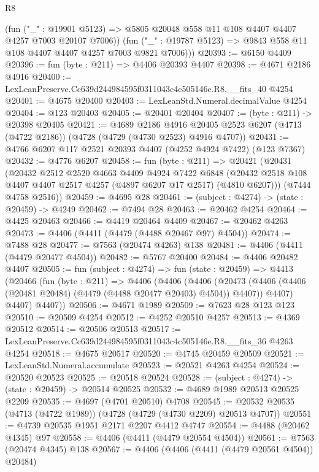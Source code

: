 \begin{lexlean}{R8}
\begin{coremodule}
          (fun ("_" : @19901 @5123) =>
          @5805 @20048 @558 @11 @108 @4407 @4407 @4257 @7003 @20107 @7006))
        (fun ("_" : @19787 @5123) => @9843 @558 @11 @108 @4407 @4407 @4257 @7003 @9821 @7006)))
@20393 := @6150 @4409
@20396 := fun (byte : @211) => @4406 @20393 @4407
@20398 := @4671 @2186 @4916
@20400 := LexLeanPreserve.Cc639d244984595f0311043c4c505146e.R8.__fits_40 @4254
@20401 := @4675 @20400
@20403 := LexLeanStd.Numeral.decimalValue @4254
@20404 := @123 @20403
@20405 := @20401 @20404
@20407 := (byte : @211) -> @20398 @20405
@20421 := @4689
    @2186
    @4916
    @20405
    @2523
    @6207
    (@4713 (@4722 @2186))
    (@4728 (@4729 (@4730 @2523) @4916 @4707))
@20431 := @4766 @6207 @117 @2521 @20393 @4407 (@4252 @4924 @7422) (@123 @7367)
@20432 := @4776 @6207
@20458 := fun (byte : @211) =>
  @20421
    (@20431
      (@20432
        @2512
        @2520
        @4663
        @4409
        @4924
        @7422
        @6848
        (@20432 @2518 @108 @4407 @4407 @2517 @4257 (@4897 @6207 @17 @2517) (@4810 @6207)))
      (@7444 @4758 @2516))
@20459 := @4695 @28
@20461 := (subject : @4274) -> (state : @20459) -> @4249
@20462 := @7494 @28
@20463 := @20462 @4254
@20464 := @4425 @20463
@20466 := @4419 @20464 @4409
@20467 := @20462 @4263
@20473 := @4406 (@4411 (@4479 (@4488 @20467 @97) @4504))
@20474 := @7488 @28
@20477 := @7563 (@20474 @4263) @138
@20481 := @4406 (@4411 (@4479 @20477 @4504))
@20482 := @5767 @20400
@20484 := @4406 @20482 @4407
@20505 := fun (subject : @4274) =>
  fun (state : @20459) =>
  @4413
    (@20466
      (fun (byte : @211) =>
      @4406
        (@4406
          (@4406
            (@20473 (@4406 (@4406 (@20481 @20484) (@4479 (@4488 @20477 @20403) @4504)) @4407))
            @4407)
          @4407)
        @4407))
@20506 := @4671 @1989
@20509 := @7623 @28 @123 @123
@20510 := @20509 @4254
@20512 := @4252 @20510 @4257
@20513 := @4369 @20512
@20514 := @20506 @20513
@20517 := LexLeanPreserve.Cc639d244984595f0311043c4c505146e.R8.__fits_36 @4263 @4254
@20518 := @4675 @20517
@20520 := @4745 @20459 @20509
@20521 := LexLeanStd.Numeral.accumulate
@20523 := @20521 @4263 @4254
@20524 := @20520 @20523
@20525 := @20518 @20524
@20528 := (subject : @4274) -> (state : @20459) -> @20514 @20525
@20532 := @4689 @1989 @20513 @20525 @2209
@20535 := @4697 (@4701 @20510) @4708
@20545 := @20532 @20535 (@4713 (@4722 @1989)) (@4728 (@4729 (@4730 @2209) @20513 @4707))
@20551 := @4739 @20535 @1951 @2171 @2207 @4412 @4747
@20554 := @4488 (@20462 @4345) @97
@20558 := @4406 (@4411 (@4479 @20554 @4504))
@20561 := @7563 (@20474 @4345) @138
@20567 := @4406 (@4406 (@4411 (@4479 @20561 @4504)) @20484)

\end{coremodule}
\end{lexlean}
